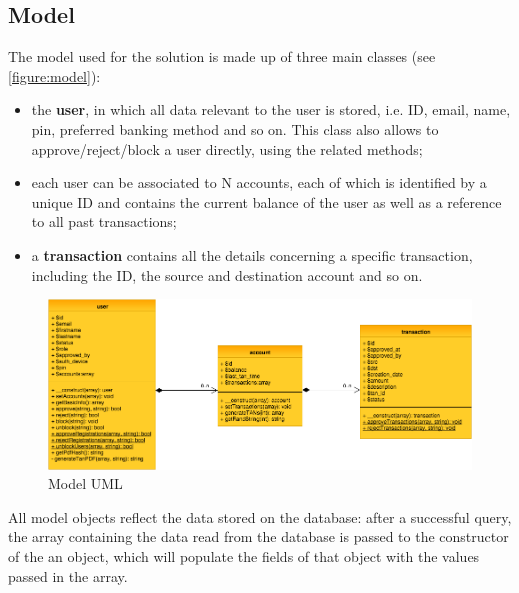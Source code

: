 \subsection{Model}
The model used for the \gnb{} solution is made up of three main classes (see \autoref{figure:model}):
\begin{itemize}
	\item the \textbf{user}, in which all data relevant to the user is stored, i.e. ID, email, name, pin, preferred banking method and so on. This class also allows to approve/reject/block a user directly, using the related methods;
	\item each user can be associated to N accounts, each of which is identified by a unique ID and contains the current balance of the user as well as a reference to all past transactions;
	\item a \textbf{transaction} contains all the details concerning a specific transaction, including the ID, the source and destination account and so on.
\end{itemize}
\begin{figure}[h!tbp]
	\centering
	\includegraphics[width=\textwidth]{figures/model_uml.png}
	\caption{Model UML}
	\label{figure:model}
\end{figure}
All model objects reflect the data stored on the database: after a successful query, the array containing the data read from the database is passed to the constructor of the an object, which will populate the fields of that object with the values passed in the array.


